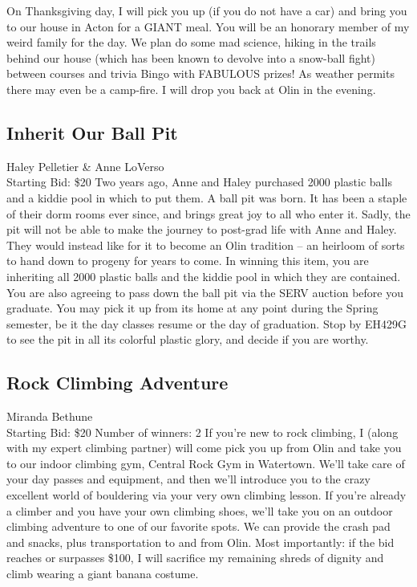 \documentclass[11pt]{article}
\begin{document}
On Thanksgiving day, I will pick you up (if you do not have a car) and bring you to our house in Acton for a GIANT meal. You will be an honorary member of my weird family for the day. We plan do some mad science, hiking in the trails behind our house (which has been known to devolve into a snow-ball fight) between courses and trivia Bingo with FABULOUS prizes!  As weather permits there may even be a camp-fire. I will drop you back at Olin in the evening.
\subsection{Inherit Our Ball Pit}
Haley Pelletier \& Anne LoVerso
\\
Starting Bid: \$20
\newline
Two years ago, Anne and Haley purchased 2000 plastic balls and a kiddie pool in which to put them. A ball pit was born. It has been a staple of their dorm rooms ever since, and brings great joy to all who enter it. Sadly, the pit will not be able to make the journey to post-grad life with Anne and Haley. They would instead like for it to become an Olin tradition -- an heirloom of sorts to hand down to progeny for years to come. In winning this item, you are inheriting all 2000 plastic balls and the kiddie pool in which they are contained. You are also agreeing to pass down the ball pit via the SERV auction before you graduate. You may pick it up from its home at any point during the Spring semester, be it the day classes resume or the day of graduation. Stop by EH429G to see the pit in all its colorful plastic glory, and decide if you are worthy.
\subsection{Rock Climbing Adventure}
Miranda Bethune
\\
Starting Bid: \$20
\newline
Number of winners: 2
\newline
If you're new to rock climbing, I (along with my expert climbing partner) will come pick you up from Olin and take you to our indoor climbing gym, Central Rock Gym in Watertown. We'll take care of your day passes and equipment, and then we'll introduce you to the crazy excellent world of bouldering via your very own climbing lesson. If you're already a climber and you have your own climbing shoes, we'll take you on an outdoor climbing adventure to one of our favorite spots. We can provide the crash pad and snacks, plus transportation to and from Olin. Most importantly: if the bid reaches or surpasses \$100, I will sacrifice my remaining shreds of dignity and climb wearing a giant banana costume.
\end{document}
